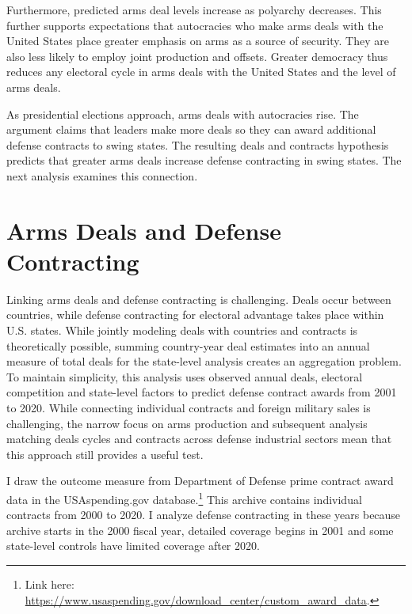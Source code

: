 \documentclass[12pt]{article}
\begin{document}
Furthermore, predicted arms deal levels increase as polyarchy decreases. 
This further supports expectations that autocracies who make arms deals with the United States place greater emphasis on arms as a source of security. 
They are also less likely to employ joint production and offsets. 
Greater democracy thus reduces any electoral cycle in arms deals with the United States and the level of arms deals. 


As presidential elections approach, arms deals with autocracies rise. 
The argument claims that leaders make more deals so they can award additional defense contracts to swing states. 
The resulting deals and contracts hypothesis predicts that greater arms deals increase defense contracting in swing states. 
The next analysis examines this connection.


\section{Arms Deals and Defense Contracting}


Linking arms deals and defense contracting is challenging. 
Deals occur between countries, while defense contracting for electoral advantage takes place within U.S. states.
While jointly modeling deals with countries and contracts is theoretically possible, summing country-year deal estimates into an annual measure of total deals for the state-level analysis creates an aggregation problem. %
To maintain simplicity, this analysis uses observed annual deals, electoral competition and state-level factors to predict defense contract awards from 2001 to 2020. 
While connecting individual contracts and foreign military sales is challenging, the narrow focus on arms production and subsequent analysis matching deals cycles and contracts across defense industrial sectors mean that this approach still provides a useful test. 



I draw the outcome measure from Department of Defense prime contract award data in the USAspending.gov database.\footnote{Link here: \url{https://www.usaspending.gov/download_center/custom_award_data}.} 
This archive contains individual contracts from 2000 to 2020.
I analyze defense contracting in these years because archive starts in the 2000 fiscal year, detailed coverage begins in 2001 and some state-level controls have limited coverage after 2020.
\end{document}
